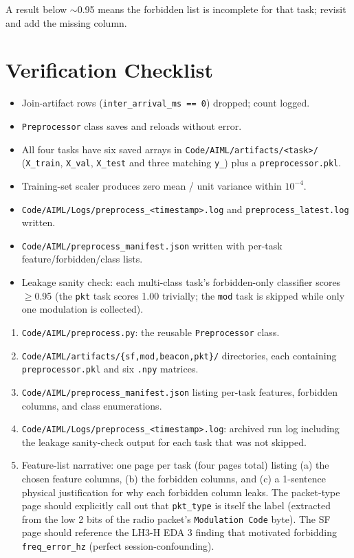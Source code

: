 \documentclass[11pt,letterpaper]{article}
\begin{document}
A result below $\sim$0.95 means the forbidden list is incomplete for that task; revisit and add the missing column.

\section{Verification Checklist}
\begin{itemize}[leftmargin=2em]
	\item[$\square$] Join-artifact rows (\texttt{inter\_arrival\_ms == 0}) dropped; count logged.
	\item[$\square$] \texttt{Preprocessor} class saves and reloads without error.
	\item[$\square$] All four tasks have six saved arrays in \texttt{Code/AIML/artifacts/<task>/} (\texttt{X\_train}, \texttt{X\_val}, \texttt{X\_test} and three matching \texttt{y\_}) plus a \texttt{preprocessor.pkl}.
	\item[$\square$] Training-set scaler produces zero mean / unit variance within $10^{-4}$.
	\item[$\square$] \texttt{Code/AIML/Logs/preprocess\_<timestamp>.log} and \texttt{preprocess\_latest.log} written.
	\item[$\square$] \texttt{Code/AIML/preprocess\_manifest.json} written with per-task feature/forbidden/class lists.
	\item[$\square$] Leakage sanity check: each multi-class task's forbidden-only classifier scores $\geq$0.95 (the \texttt{pkt} task scores 1.00 trivially; the \texttt{mod} task is skipped while only one modulation is collected).
\end{itemize}

\begin{tcolorbox}[deliverable={Lab Handout 4-B Deliverable}]
	\begin{enumerate}[leftmargin=1.2em]
		\item \texttt{Code/AIML/preprocess.py}: the reusable \texttt{Preprocessor} class.
		\item \texttt{Code/AIML/artifacts/\{sf,mod,beacon,pkt\}/} directories, each containing \texttt{preprocessor.pkl} and six \texttt{.npy} matrices.
		\item \texttt{Code/AIML/preprocess\_manifest.json} listing per-task features, forbidden columns, and class enumerations.
		\item \texttt{Code/AIML/Logs/preprocess\_<timestamp>.log}: archived run log including the leakage sanity-check output for each task that was not skipped.
		\item Feature-list narrative: one page per task (four pages total) listing (a) the chosen feature columns, (b) the forbidden columns, and (c) a 1-sentence physical justification for why each forbidden column leaks. The packet-type page should explicitly call out that \texttt{pkt\_type} is itself the label (extracted from the low 2 bits of the radio packet's \texttt{Modulation Code} byte). The SF page should reference the LH3-H \mbox{EDA} 3 finding that motivated forbidding \texttt{freq\_error\_hz} (perfect session-confounding).
	\end{enumerate}
\end{tcolorbox}

\printhandoutglossary
\end{document}
